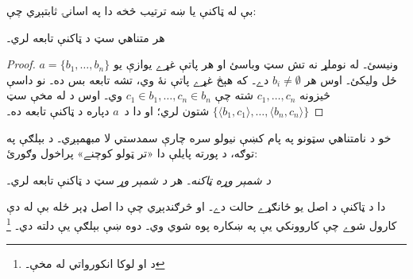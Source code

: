 \documentclass[../../../include/open-logic-section]{subfiles}
\begin{document}

بې له ټاکنې يا ښه ترتيب څخه دا په اسانۍ ثابتېږي چې:

\begin{lem}
هر متناهي سټ د ټاکنې تابعه لري۔
\end{lem}

\begin{proof}
$a = \{b_1, \ldots, b_n\}$ ونیسئ۔ له نوملړ نه تش سټ وباسئ او هر پاتې غړے يوازې يو ځل
وليکئ۔ اوس هر $b_i
\neq \emptyset$ دے۔ که هېڅ غړے پاتې نۀ وي، تشه تابعه
بس ده۔ نو داسې څيزونه
$c_1, \ldots, c_n$ شته چې
$c_1 \in b_1, \ldots, c_n \in b_n$ وي۔
اوس د
 له مخې
سټ $\{\langle b_1,
c_1\rangle , \ldots, \langle b_n, c_n\rangle\}$
شتون لري؛ او دا د~$a$ دپاره د ټاکنې تابعه ده۔
\end{proof}

خو د نامتناهي سټونو په پام کښې نيولو سره چارې
سمدستي لا مبهمېږي۔ د بېلګې په توګه، د پورته
پايلې دا «تر ټولو کوچنے» پراخول وګورئ:

\begin{defish}
\emph{د شمېر وړه ټاکنه۔} هر \emph{د شمېر وړ}
سټ د ټاکنې تابعه لري۔
\end{defish}

دا د ټاکنې د اصل يو ځانګړے حالت دے۔ او څرګندېږي
چې دا اصل ډېر ځله بې له دې کارول شوے چې کاروونکي
يې په ښکاره پوه شوي وي۔ دوه ښې بېلګې يې دلته دي۔
\footnote{د \citet[\S9.4]{Potter2004} او لوکا
انکورواتي له مخې۔}
\end{document}
